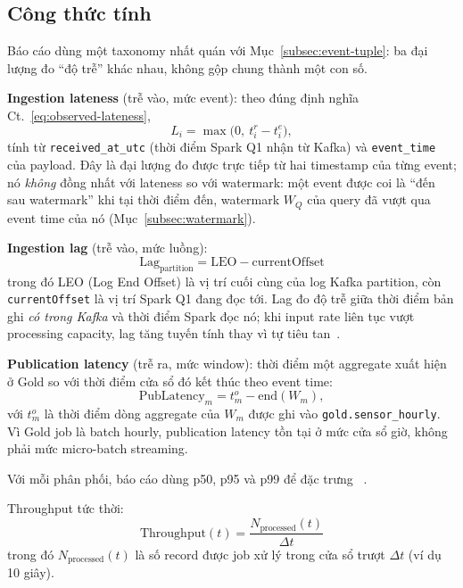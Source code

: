 \subsection{Công thức tính}
\label{subsec:formulas}

Báo cáo dùng một taxonomy nhất quán với Mục~\ref{subsec:event-tuple}: ba đại
lượng đo ``độ trễ'' khác nhau, không gộp chung thành một con số.

\textbf{Ingestion lateness} (trễ vào, mức event): theo đúng định nghĩa
Ct.~\ref{eq:observed-lateness},
\begin{equation}
  L_i = \max\bigl(0,\ t^{r}_i - t^{e}_i\bigr),
  \label{eq:ingestion-lateness}
\end{equation}
tính từ \texttt{received\_at\_utc} (thời điểm Spark Q1 nhận từ Kafka) và
\texttt{event\_time} của payload. Đây là đại lượng đo được trực tiếp từ hai
timestamp của từng event; nó \emph{không} đồng nhất với lateness so với
watermark: một event được coi là ``đến sau watermark'' khi tại thời điểm đến,
watermark $W_Q$ của query đã vượt qua event time của nó
(Mục~\ref{subsec:watermark}).

\textbf{Ingestion lag} (trễ vào, mức luồng):
\begin{equation}
  \mathrm{Lag}_{\text{partition}} = \mathrm{LEO} - \mathrm{currentOffset}
  \label{eq:consumer-lag}
\end{equation}
trong đó LEO (Log End Offset) là vị trí cuối cùng của log Kafka partition,
còn \texttt{currentOffset} là vị trí Spark Q1 đang đọc tới. Lag đo độ trễ
giữa thời điểm bản ghi \emph{có trong Kafka} và thời điểm Spark đọc nó; khi
input rate liên tục vượt processing capacity, lag tăng tuyến tính thay vì tự
tiêu tan~\cite{confluent_optimize_clients}.

\textbf{Publication latency} (trễ ra, mức window): thời điểm một aggregate
xuất hiện ở Gold so với thời điểm cửa sổ đó kết thúc theo event time:
\begin{equation}
  \mathrm{PubLatency}_m = t^{o}_m - \mathrm{end}(W_m),
  \label{eq:publication-latency}
\end{equation}
với $t^{o}_m$ là thời điểm dòng aggregate của $W_m$ được ghi vào
\texttt{gold.sensor\_hourly}. Vì Gold job là batch hourly, publication latency
tồn tại ở mức cửa sổ giờ, không phải mức micro-batch streaming.

Với mỗi phân phối, báo cáo dùng p50, p95 và p99 để đặc trưng
~\cite{iot_stream_latency_2021}.

Throughput tức thời:
\begin{equation}
  \mathrm{Throughput}(t) = \frac{N_{\text{processed}}(t)}{\Delta t}
  \label{eq:throughput}
\end{equation}
trong đó $N_{\text{processed}}(t)$ là số record được job xử lý
trong cửa sổ trượt $\Delta t$ (ví dụ 10 giây).

